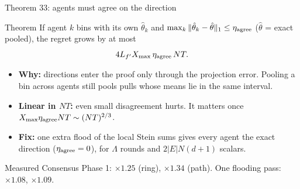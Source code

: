 \documentclass[11pt]{beamer}
\begin{document}
\begin{frame}{Theorem 33: agents must agree on the direction}
\footnotesize
\begin{block}{Theorem}
If agent $k$ bins with its own $\hat\theta_k$ and $\max_k\|\hat\theta_k-\hat\theta\|_1\le\eta_{\rm agree}$ ($\hat\theta$ = exact pooled), the regret grows by at most
\[
4L_{f'}X_{\max}\,\eta_{\rm agree}\,NT .
\]
\end{block}
\begin{itemize}
\item \textbf{Why:} directions enter the proof only through the projection error. Pooling a bin across agents still pools pulls whose means lie in the same interval.
\item \textbf{Linear in $NT$:} even small disagreement hurts. It matters once $X_{\max}\eta_{\rm agree}NT\sim(NT)^{2/3}$.
\item \textbf{Fix:} one extra flood of the local Stein sums gives every agent the exact direction ($\eta_{\rm agree}=0$), for $\Lambda$ rounds and $2|E|N(d{+}1)$ scalars.
\end{itemize}
\begin{block}{Measured}
Consensus Phase 1: $\times1.25$ (ring), $\times1.34$ (path). One flooding pass: $\times1.08$, $\times1.09$.
\end{block}
\end{frame}
\end{document}
